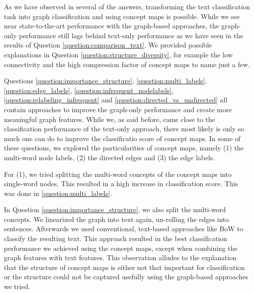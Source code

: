 
As we have observed in several of the answers, transforming the text classification task into graph classification and using concept maps is possible.
While we see near state-to-the-art performance with the graph-based approaches, the graph-only performance still lags behind text-only performance as we have seen in the results of Question \ref{question:comparison_text}.
We provided possible explanations in Question \ref{question:structure_diversity}, for example the low connectivity and the high compression factor of concept maps to name just a few.

Questions \ref{question:importance_structure}, \ref{question:multi_labels}, \ref{question:edge_labels}, \ref{question:infrequent_nodelabels}, \ref{question:relabeling_infrequent} and  \ref{question:directed_vs_undirected} all contain approaches to improve the graph-only performance and create more meaningful graph features.
While we, as said before, came close to the classification performance of the text-only approach, there most likely is only so much one can do to improve the classificatio score of concept maps.
In some of these questions, we explored the particularities of concept maps, namely (1) the multi-word node labels, (2) the directed edges and (3) the edge labels.

For (1), we tried splitting the multi-word concepts of the concept maps into single-word nodes.
This resulted in a high increase in classification score.
This was done in \ref{question:multi_labels}.

In Question \ref{question:importance_structure}, we also split the multi-word concepts. We linearized the graph into text again, un-rolling the edges into sentences. Afterwards we used conventional, text-based approaches like BoW to classify the resulting text.
This approach resulted in the best classification performance we achieved using the concept maps, except when combining the graph features with text features.
This observation alludes to the explanation that the structure of concept maps is either not that important for classification or the structure could not be captured usefully using the graph-based approaches we tried.

